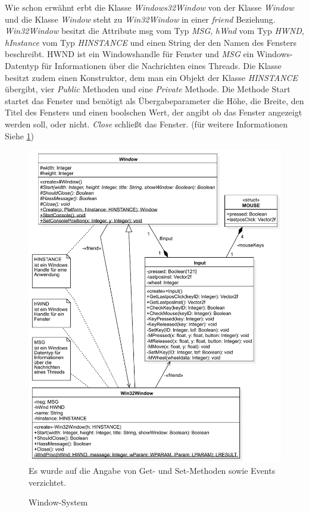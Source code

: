 Wie schon erwähnt erbt die Klasse \textit{Windows32Window} von der Klasse \textit{Window} und die Klasse \textit{Window} steht zu \textit{Win32Window} in einer \textit{friend} Beziehung.
\textit{Win32Window} besitzt die Attribute msg vom Typ \textit{MSG}, \textit{hWnd} vom Typ \textit{HWND}, \textit{hInstance} vom Typ \textit{HINSTANCE} und einen String der den Namen des Fensters beschreibt.
HWND ist ein Windowshandle für Fenster und \textit{MSG} ein Windows-Datentyp für Informationen über die Nachrichten eines Threads. 
Die Klasse besitzt zudem einen Konstruktor, dem man ein Objekt der Klasse \textit{HINSTANCE} übergibt, vier \textit{Public} Methoden und eine \textit{Private} Methode. Die Methode Start startet das Fenster und benötigt als Übergabeparameter die Höhe, die Breite, den Titel des Fensters und einen boolschen Wert, der angibt ob das Fenster angezeigt werden soll, oder nicht.
\textit{Close} schließt das Fenster. (für weitere Informationen Siehe \cref{Windowsystem})

\begin{figure}
	\begin{center}
		\includegraphics[width=\textwidth]{03unserprogramm/Engine/WindowSystem.pdf}
		Es wurde auf die Angabe von Get- und Set-Methoden sowie Events verzichtet.
		\caption{Window-System}\label{Windowsystem}
	\end{center}
\end{figure}

